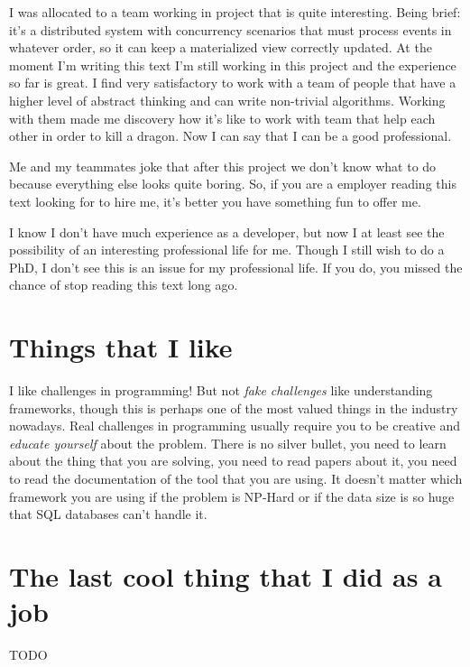 \documentclass[11pt,a4paper,sans]{moderncv}
\begin{document}
\medskip

I was allocated to a team working in project that is quite interesting.
Being brief: it's a distributed system with concurrency scenarios that must process events in whatever order, so it can keep a materialized view correctly updated.
At the moment I'm writing this text I'm still working in this project and the experience so far is great.
I find very satisfactory to work with a team of people that have a higher level of abstract thinking and can write non-trivial algorithms.
Working with them made me discovery how it's like to work with team that help each other in order to kill a dragon.
Now I can say that I can be a good professional.

\medskip

Me and my teammates joke that after this project we don't know what to do because everything else looks quite boring.
So, if you are a employer reading this text looking for to hire me, it's better you have something fun to offer me.

\medskip

I know I don't have much experience as a developer, but now I at least see the possibility of an interesting professional life for me.
Though I still wish to do a PhD, I don't see this is an issue for my professional life.
If you do, you missed the chance of stop reading this text long ago.

\section{Things that I like}
I like challenges in programming! But not \textit{fake challenges} like understanding frameworks, though this is perhaps one of the most valued things in the industry nowadays.
Real challenges in programming usually require you to be creative and \textit{educate yourself} about the problem.
There is no silver bullet, you need to learn about the thing that you are solving, you need to read papers about it, you need to read the documentation of the tool that you are using.
It doesn't matter which framework you are using if the problem is NP-Hard or if the data size is so huge that SQL databases can't handle it.

\section{The last cool thing that I did as a job}
TODO
\end{document}
